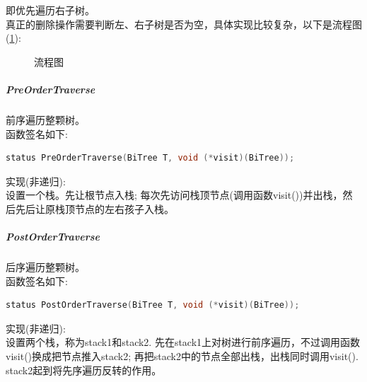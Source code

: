\documentclass[supercite]{Experimental_Report}
\theoremstyle{definition}
\begin{document}
\noindent
即优先遍历右子树。\\
真正的删除操作需要判断左、右子树是否为空，具体实现比较复杂，以下是流程图(\ref{fig6-9}):
\begin{figure}[H]
	\centering
	\centering
	\caption{流程图}
	\label{fig6-9}
\end{figure}

\clearpage
\subparagraph{PreOrderTraverse}
\noindent
前序遍历整颗树。 \\
函数签名如下:
\begin{lstlisting}[language=C++, frame=single]
status PreOrderTraverse(BiTree T, void (*visit)(BiTree));
\end{lstlisting}
实现(非递归): \\
设置一个栈。先让根节点入栈; 每次先访问栈顶节点(调用函数visit())并出栈，然后先后让原栈顶节点的左右孩子入栈。 \\

\subparagraph{PostOrderTraverse}
\noindent
后序遍历整颗树。 \\
函数签名如下:
\begin{lstlisting}[language=C++, frame=single]
status PostOrderTraverse(BiTree T, void (*visit)(BiTree));
\end{lstlisting}
实现(非递归): \\
设置两个栈，称为stack1和stack2. 先在stack1上对树进行前序遍历，不过调用函数visit()换成把节点推入stack2; 再把stack2中的节点全部出栈，出栈同时调用visit(). stack2起到将先序遍历反转的作用。\\
\end{document}
